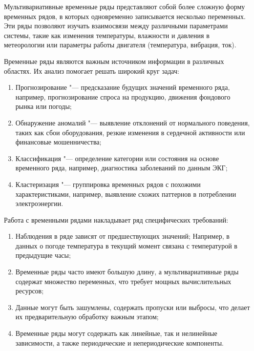 \documentclass[spec, och, diploma]{SCWorks}
\begin{document}
            Мультивариативные временные ряды представляют собой более сложную форму
            временных рядов, в которых одновременно записывается несколько
            переменных. Эти ряды позволяют изучать взаимосвязи между различными
            параметрами системы, такие как изменения температуры, влажности и
            давления в метеорологии или параметры работы двигателя (температура,
            вибрация, ток).

            Временные ряды являются важным источником информации в различных
            областях. Их анализ помогает решать широкий круг задач:

            \begin{enumerate}
                \item Прогнозирование "--- предсказание будущих значений временного
                ряда, например, прогнозирование спроса на продукцию, движения
                фондового рынка или погоды;
                \item Обнаружение аномалий "--- выявление отклонений от нормального
                поведения, таких как сбои оборудования, резкие изменения в сердечной
                активности или финансовые мошенничества;
                \item Классификация "--- определение категории или состояния на
                основе временного ряда, например, диагностика заболеваний по данным
                ЭКГ;
                \item Кластеризация "--- группировка временных рядов с похожими
                характеристиками, например, выявление схожих паттернов в потреблении
                электроэнергии.
            \end{enumerate}

            Работа с временными рядами накладывает ряд специфических требований:

            \begin{enumerate}
                \item Наблюдения в ряде зависят от предшествующих значений;
                Например, в данных о погоде температура в текущий момент связана с
                температурой в предыдущие часы;
                \item Временные ряды часто имеют большую длину, а мультивариативные
                ряды содержат множество переменных, что требует мощных
                вычислительных ресурсов;
                \item Данные могут быть зашумлены, содержать пропуски или выбросы,
                что делает их предварительную обработку важным этапом;
                \item Временные ряды могут содержать как линейные, так и нелинейные
                зависимости, а также периодические и непериодические компоненты.
            \end{enumerate}
\end{document}
